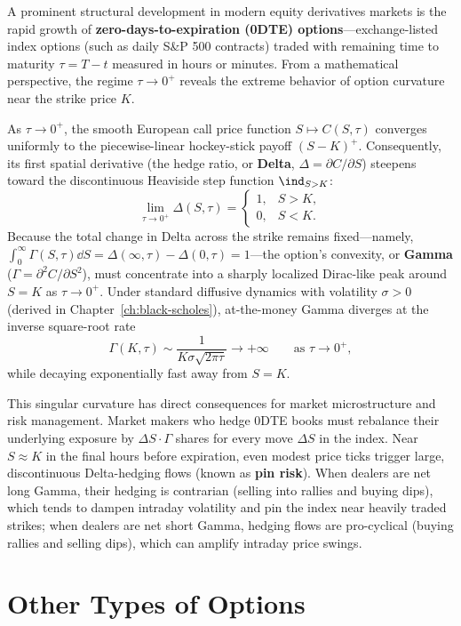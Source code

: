 A prominent structural development in modern equity derivatives markets is the rapid growth of \textbf{zero-days-to-expiration (0DTE) options}---exchange-listed index options (such as daily S\&P 500 contracts) traded with remaining time to maturity $\tau = T - t$ measured in hours or minutes. From a mathematical perspective, the regime $\tau \to 0^+$ reveals the extreme behavior of option curvature near the strike price $K$.

As $\tau \to 0^+$, the smooth European call price function $S \mapsto C(S, \tau)$ converges uniformly to the piecewise-linear hockey-stick payoff $(S - K)^+$. Consequently, its first spatial derivative (the hedge ratio, or \textbf{Delta}, $\Delta = \partial C / \partial S$) steepens toward the discontinuous Heaviside step function $\ind_{S > K}$:
\[
    \lim_{\tau \to 0^+} \Delta(S, \tau) =
    \begin{cases}
        1, & S > K, \\
        0, & S < K.
    \end{cases}
\]
Because the total change in Delta across the strike remains fixed---namely, $\int_0^\infty \Gamma(S, \tau)\dd S = \Delta(\infty, \tau) - \Delta(0, \tau) = 1$---the option's convexity, or \textbf{Gamma} ($\Gamma = \partial^2 C / \partial S^2$), must concentrate into a sharply localized Dirac-like peak around $S = K$ as $\tau \to 0^+$. Under standard diffusive dynamics with volatility $\sigma > 0$ (derived in Chapter~\ref{ch:black-scholes}), at-the-money Gamma diverges at the inverse square-root rate
\[
    \Gamma(K, \tau) \sim \frac{1}{K \sigma \sqrt{2\pi \tau}} \longrightarrow +\infty \qquad \text{as } \tau \to 0^+,
\]
while decaying exponentially fast away from $S = K$.

This singular curvature has direct consequences for market microstructure and risk management. Market makers who hedge 0DTE books must rebalance their underlying exposure by $\Delta S \cdot \Gamma$ shares for every move $\Delta S$ in the index. Near $S \approx K$ in the final hours before expiration, even modest price ticks trigger large, discontinuous Delta-hedging flows (known as \textbf{pin risk}). When dealers are net long Gamma, their hedging is contrarian (selling into rallies and buying dips), which tends to dampen intraday volatility and pin the index near heavily traded strikes; when dealers are net short Gamma, hedging flows are pro-cyclical (buying rallies and selling dips), which can amplify intraday price swings.

\section{Other Types of Options}

